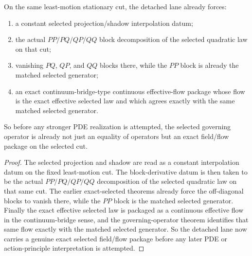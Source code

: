 \begin{theorem}
\label{thm:the-selected-governing-operator-already-carries-an-exact-continuous-effective-flow-package}
On the same least-motion stationary cut, the detached lane already forces:
\begin{enumerate}
\item a constant selected projection/shadow interpolation datum;
\item the actual \(PP/PQ/QP/QQ\) block decomposition of the selected quadratic
      law on that cut;
\item vanishing \(PQ\), \(QP\), and \(QQ\) blocks there, while the \(PP\)
      block is already the matched selected generator;
\item an exact continuum-bridge-type continuous effective-flow package whose flow is
      the exact effective selected law and which agrees exactly with the same
      matched selected generator.
\end{enumerate}
So before any stronger PDE realization is attempted, the selected governing
operator is already not just an equality of operators but an exact
field/flow package on the selected cut.
\end{theorem}

\begin{proof}
The selected projection and shadow are read as a constant interpolation datum
on the fixed least-motion cut. The block-derivative datum is then taken to be
the actual \(PP/PQ/QP/QQ\) decomposition of the selected quadratic law on that
same cut. The earlier exact-selected theorems already force the off-diagonal
blocks to vanish there, while the \(PP\) block is the matched selected
generator. Finally the exact effective selected law is packaged as a
continuous effective flow in the continuum-bridge sense, and the governing-operator
theorem identifies that same flow exactly with the matched selected generator.
So the detached lane now carries a genuine exact selected field/flow package
before any later PDE or action-principle interpretation is attempted.
\end{proof}


